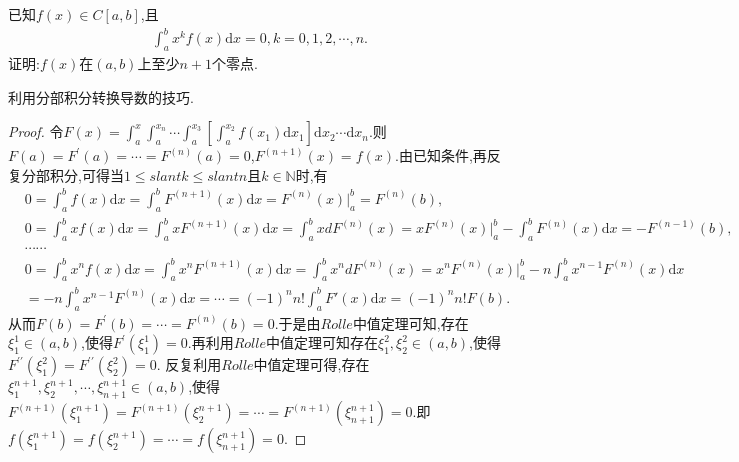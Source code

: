 \documentclass[../../main.tex]{subfiles}
\begin{document}
\begin{example}\label{example245574}
已知$f(x)\in C[a,b]$,且
\begin{align*}
\int_a^b{x^kf\left( x \right) \mathrm{d}x}=0, k=0,1,2,\cdots ,n .
\end{align*}
证明:$f(x)$在$(a,b)$上至少$n+1$个零点.
\end{example}
\begin{note}
利用分部积分转换导数的技巧.
\end{note}
\begin{proof}
令\(F(x)=\int_a^x\int_a^{x_n}\cdots\int_a^{x_3}\left[\int_a^{x_2}f(x_1)\mathrm{d}x_1\right]\mathrm{d}x_2\cdots \mathrm{d}x_n\).则\(F(a)=F^\prime(a)=\cdots=F^{(n)}(a)=0\),\(F^{(n + 1)}(x)=f(x)\).由已知条件,再反复分部积分,可得当\(1\leqslant slant k\leqslant slant n\)且\(k\in\mathbb{N}\)时,有
\begin{align*}
&0=\int_a^b{f\left( x \right) \mathrm{d}x}=\int_a^b{F^{\left( n+1 \right)}\left( x \right) \mathrm{d}x}=F^{\left( n \right)}\left( x \right) \Big|_{a}^{b}=F^{\left( n \right)}\left( b \right) ,
\\
&0=\int_a^b{xf\left( x \right) \mathrm{d}x}=\int_a^b{xF^{\left( n+1 \right)}\left( x \right) \mathrm{d}x}=\int_a^b{xdF^{\left( n \right)}\left( x \right)}=xF^{\left( n \right)}\left( x \right) \Big| _{a}^{b}-\int_a^b{F^{\left( n \right)}\left( x \right) \mathrm{d}x}=-F^{\left( n-1 \right)}\left( b \right) ,
\\
&\cdots \cdots 
\\
&0=\int_a^b{x^nf\left( x \right) \mathrm{d}x}=\int_a^b{x^nF^{\left( n+1 \right)}\left( x \right) \mathrm{d}x}=\int_a^b{x^ndF^{\left( n \right)}\left( x \right)}=x^nF^{\left( n \right)}\left( x \right) \Big| _{a}^{b}-n\int_a^b{x^{n-1}F^{\left( n \right)}\left( x \right) \mathrm{d}x}
\\
&=-n\int_a^b{x^{n-1}F^{\left( n \right)}\left( x \right) \mathrm{d}x}=\cdots =\left( -1 \right) ^nn!\int_a^b{F\prime\left( x \right) \mathrm{d}x}=\left( -1 \right) ^nn!F\left( b \right) .
\end{align*}
从而\(F(b)=F^\prime(b)=\cdots=F^{(n)}(b)=0\).于是由\(Rolle\)中值定理可知,存在\(\xi_1^1\in(a,b)\),使得\(F^\prime(\xi_1^1)=0\).再利用\(Rolle\)中值定理可知存在\(\xi_1^2,\xi_2^2\in(a,b)\),使得\(F^{\prime\prime}(\xi_1^2)=F^{\prime\prime}(\xi_2^2)=0\).
反复利用\(Rolle\)中值定理可得,存在\(\xi_1^{n + 1},\xi_2^{n + 1},\cdots,\xi_{n + 1}^{n + 1}\in(a,b)\),使得\(F^{(n + 1)}(\xi_1^{n + 1})=F^{(n + 1)}(\xi_2^{n + 1})=\cdots=F^{(n + 1)}(\xi_{n + 1}^{n + 1})=0\).即\(f(\xi_1^{n + 1})=f(\xi_2^{n + 1})=\cdots=f(\xi_{n + 1}^{n + 1})=0\).
\end{proof}
\end{document}
